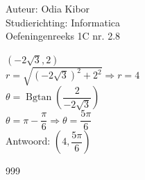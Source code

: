\documentclass[a4paper]{article}
\begin{document}
  
\noindent \large Auteur: Odia Kibor \\
\noindent \large Studierichting: Informatica\\
\noindent \large Oefeningenreeks 1C nr. 2.8\\

\medskip

\normalsize

$(-2\sqrt{3}, 2)$\\

$r = \sqrt{(-2\sqrt{3})^2 + 2^2} \Rightarrow r = 4$\\

$\theta = \operatorname{Bgtan}\left (\dfrac{2}{-2\sqrt{3}} \right)$\\

$\theta = \pi - \dfrac{\pi}{6} \Rightarrow \theta = \dfrac{5\pi}{6}$\\

Antwoord: $\left (4,\dfrac{5\pi}{6}\right)$





\begin{thebibliography}{999}
\end{thebibliography}
\end{document}
